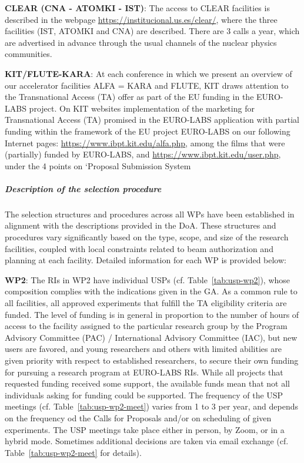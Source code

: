 \textbf{CLEAR (CNA - ATOMKI - IST)}: The access to CLEAR facilities is described in the webpage \url{https://institucional.us.es/clear/}, where the three facilities (IST, ATOMKI and CNA) are described. There are 3 calls a year, which are advertised in advance through the usual channels of the nuclear physics communities.

\textbf{KIT/FLUTE-KARA}: At each conference in which we present an overview of our accelerator facilities ALFA = KARA and FLUTE, KIT draws attention to the Transnational Access (TA) offer as part of the EU funding in the EURO-LABS project. On KIT websites implementation of the marketing for Transnational Access (TA) promised in the EURO-LABS application with partial funding within the framework of the EU project EURO-LABS on our following Internet pages: \url{https://www.ibpt.kit.edu/alfa.php}, among the films that were (partially) funded by EURO-LABS, and
\url{https://www.ibpt.kit.edu/user.php}, under the 4 points on ‘Proposal Submission System


\subparagraph{Description of the selection procedure}\mbox{}

The selection structures and procedures across all WPs have been established in alignment with the descriptions provided in the DoA. These structures and procedures vary significantly based on the type, scope, and size of the research facilities, coupled with local constraints related to beam authorization and planning at each facility. Detailed information for each WP is provided below:

\textbf{WP2}: The RIs in WP2 have individual USPs (cf. Table~\ref{tab:usp-wp2}), whose composition complies with the indications given in the GA. As a common rule to all facilities, all approved experiments that fulfill the TA eligibility criteria are funded. The level of funding is in general in proportion to the number of hours of access to the facility assigned to the particular research group by the Program Advisory Committee (PAC) / International Advisory Committee (IAC), but new users are favored, and young researchers and others with limited abilities are given priority with respect to established researchers, to secure their own funding for pursuing a research program at EURO-LABS RIs. While all projects that requested funding received some support, the available funds mean that not all individuals asking for funding could be supported. The frequency of the USP meetings (cf. Table~\ref{tab:usp-wp2-meet}) varies from 1 to 3 per year, and depends on the frequency od the Calls for Proposals and/or on scheduling of given experiments. The USP meetings take place either in person, by Zoom, or in a hybrid mode. Sometimes additional decisions are taken via email exchange (cf. Table~\ref{tab:usp-wp2-meet} for details).

